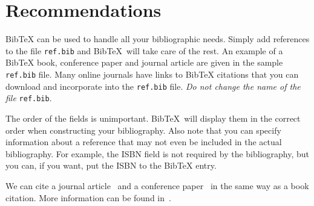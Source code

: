 
\newcommand{\BibTeX}{Bib\TeX}

\chapter{Recommendations}\label{chap:recommendations}

\BibTeX{} can be used to handle all your bibliographic needs.  Simply add
references to the file \texttt{ref.bib} and \BibTeX\ will take care of
the rest.  An example of a \BibTeX{} book, conference paper and journal
article are given in the sample \texttt{ref.bib} file.  Many online
journals have links to \BibTeX{} citations that you can download and
incorporate into the \texttt{ref.bib} file. {\it Do not change the name of
  the file} \texttt{ref.bib}.

The order of the fields is unimportant. \BibTeX\ will display them
in the correct order when constructing your bibliography.  Also note
that you can specify information about a reference that may not even be
included in the actual bibliography.  For example, the ISBN field is not
required by the bibliography, but you can, if you want, put the ISBN to
the \BibTeX{} entry.

We can cite a journal article~\cite{someguy2002} and a conference
paper~\cite{LastName1996} in the same way as a book citation.  More
information can be found in~\cite{lam1994}.
